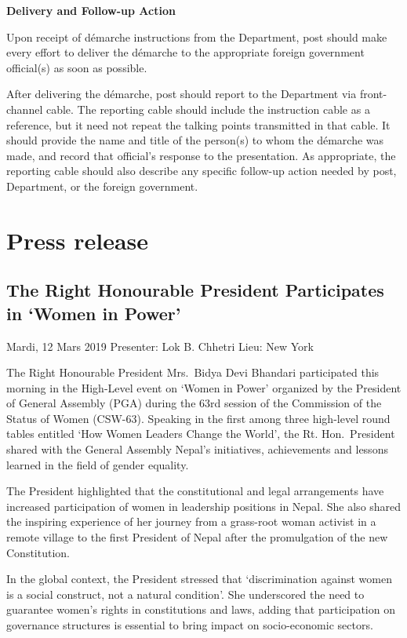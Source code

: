 \documentclass[
  openany]{book}
\begin{document}
\textbf{Delivery and Follow-up Action}

Upon receipt of démarche instructions from the Department, post should make every effort to deliver the démarche to the appropriate foreign government official(s) as soon as possible.

After delivering the démarche, post should report to the Department via front-channel cable. The reporting cable should include the instruction cable as a reference, but it need not repeat the talking points transmitted in that cable. It should provide the name and title of the person(s) to whom the démarche was made, and record that official's response to the presentation. As appropriate, the reporting cable should also describe any specific follow-up action needed by post, Department, or the foreign government.

\hypertarget{press-release}{%
\section{Press release}\label{press-release}}

\hypertarget{the-right-honourable-president-participates-in-women-in-power}{%
\subsection{The Right Honourable President Participates in `Women in Power'}\label{the-right-honourable-president-participates-in-women-in-power}}

Mardi, 12 Mars 2019
Presenter: Lok B. Chhetri
Lieu: New York

The Right Honourable President Mrs.~Bidya Devi Bhandari participated this morning in the High-Level event on `Women in Power' organized by the President of General Assembly (PGA) during the 63rd session of the Commission of the Status of Women (CSW-63). Speaking in the first among three high-level round tables entitled `How Women Leaders Change the World', the Rt. Hon.~President shared with the General Assembly Nepal's initiatives, achievements and lessons learned in the field of gender equality.

The President highlighted that the constitutional and legal arrangements have increased participation of women in leadership positions in Nepal. She also shared the inspiring experience of her journey from a grass-root woman activist in a remote village to the first President of Nepal after the promulgation of the new Constitution.

In the global context, the President stressed that `discrimination against women is a social construct, not a natural condition'. She underscored the need to guarantee women's rights in constitutions and laws, adding that participation on governance structures is essential to bring impact on socio-economic sectors.
\end{document}
